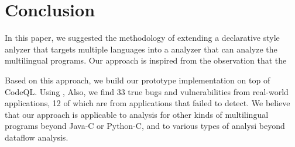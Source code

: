 \section{Conclusion}\label{sec:conclude}
In this paper, we suggested the methodology of extending a declarative style
anlyzer that targets multiple languages into a analyzer that can analyze the
multilingual programs. Our approach is inspired from the observation that the


Based on this approach, we build our prototype implementation \ours on top of
CodeQL.  Using \ours, Also, we find 33 true bugs and vulnerabilities from
real-world applications, 12 of which are from applications that \lees failed to
detect.  We believe that our approach is applicable to analysis for other kinds
of multilingual programs beyond Java-C or Python-C, and to various types of
analysi beyond dataflow analysis.
